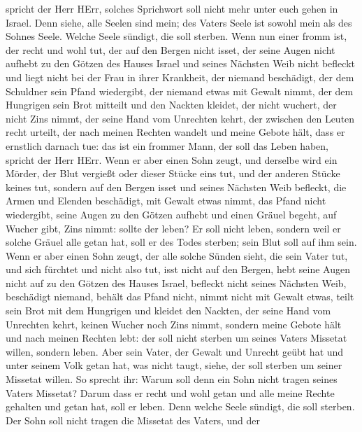 spricht der Herr HErr, solches Sprichwort soll nicht mehr unter euch
gehen in Israel.  Denn siehe, alle Seelen sind mein; des
Vaters Seele ist sowohl mein als des Sohnes Seele. Welche Seele sündigt,
die soll sterben.  Wenn nun einer fromm ist, der recht und
wohl tut,  der auf den Bergen nicht isset, der seine Augen
nicht aufhebt zu den Götzen des Hauses Israel und seines Nächsten Weib
nicht befleckt und liegt nicht bei der Frau in ihrer Krankheit,
 der niemand beschädigt, der dem Schuldner sein Pfand
wiedergibt, der niemand etwas mit Gewalt nimmt, der dem Hungrigen sein
Brot mitteilt und den Nackten kleidet,  der nicht wuchert,
der nicht Zins nimmt, der seine Hand vom Unrechten kehrt, der zwischen
den Leuten recht urteilt,  der nach meinen Rechten wandelt
und meine Gebote hält, dass er ernstlich darnach tue: das ist ein
frommer Mann, der soll das Leben haben, spricht der Herr HErr.
 Wenn er aber einen Sohn zeugt, und derselbe wird ein
Mörder, der Blut vergießt oder dieser Stücke eins tut,  und
der anderen Stücke keines tut, sondern auf den Bergen isset und seines
Nächsten Weib befleckt,  die Armen und Elenden beschädigt,
mit Gewalt etwas nimmt, das Pfand nicht wiedergibt, seine Augen zu den
Götzen aufhebt und einen Gräuel begeht,  auf Wucher gibt,
Zins nimmt: sollte der leben? Er soll nicht leben, sondern weil er
solche Gräuel alle getan hat, soll er des Todes sterben; sein Blut soll
auf ihm sein.  Wenn er aber einen Sohn zeugt, der alle
solche Sünden sieht, die sein Vater tut, und sich fürchtet und nicht
also tut,  isst nicht auf den Bergen, hebt seine Augen
nicht auf zu den Götzen des Hauses Israel, befleckt nicht seines
Nächsten Weib,  beschädigt niemand, behält das Pfand nicht,
nimmt nicht mit Gewalt etwas, teilt sein Brot mit dem Hungrigen und
kleidet den Nackten,  der seine Hand vom Unrechten kehrt,
keinen Wucher noch Zins nimmt, sondern meine Gebote hält und nach meinen
Rechten lebt: der soll nicht sterben um seines Vaters Missetat willen,
sondern leben.  Aber sein Vater, der Gewalt und Unrecht
geübt hat und unter seinem Volk getan hat, was nicht taugt, siehe, der
soll sterben um seiner Missetat willen.  So sprecht ihr:
Warum soll denn ein Sohn nicht tragen seines Vaters Missetat? Darum dass
er recht und wohl getan und alle meine Rechte gehalten und getan hat,
soll er leben.  Denn welche Seele sündigt, die soll
sterben. Der Sohn soll nicht tragen die Missetat des Vaters, und der
